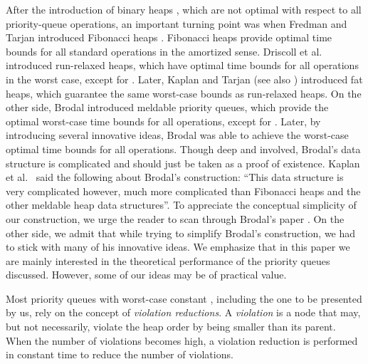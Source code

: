 \documentclass{llncs}
\newcommand{\Decrease}{\mbox{}}
\newcommand{\Meld}{\mbox{}}
\begin{document}
After the introduction of binary heaps \cite{Wil64}, which are not
optimal with respect to all priority-queue operations, an important
turning point was when Fredman and Tarjan introduced Fibonacci heaps
\cite{FT87}. Fibonacci heaps provide optimal time bounds for all
standard operations in the amortized sense.  Driscoll et
al.~\cite{DGST88} introduced run-relaxed heaps, which have optimal
time bounds for all operations in the worst case, except for
\Meld{}. Later, Kaplan and Tarjan \cite{KT99} (see also \cite{KST02})
introduced fat heaps, which guarantee the same worst-case bounds as
run-relaxed heaps.  On the other side, Brodal \cite{Bro95} introduced
meldable priority queues, which provide the optimal worst-case time
bounds for all operations, except for \Decrease{}. Later, by
introducing several innovative ideas, Brodal \cite{Bro96} was able to
achieve the worst-case optimal time bounds for all operations.  Though
deep and involved, Brodal's data structure is complicated and should
just be taken as a proof of existence.
Kaplan et al.~\cite{KST02} said the following about Brodal's construction: 
``This data structure is very complicated however, much more complicated 
than Fibonacci heaps and the other meldable heap data structures''.  
To appreciate the conceptual simplicity of our construction, we urge the 
reader to scan through Brodal's paper \cite{Bro96}.  On the other side, 
we admit that while trying to simplify Brodal's construction, we had to 
stick with many of his innovative ideas.
We emphasize that in this paper we are mainly interested in the
theoretical performance of the priority queues discussed.  However,
some of our ideas may be of practical value.

Most priority queues with worst-case constant \Decrease{}, including
the one to be presented by us, rely on the concept of \emph{violation
  reductions}.  A \emph{violation} is a node that may, but not necessarily, violate the heap
order by being smaller than its parent.  When the number of violations
becomes high, a violation reduction is performed in constant time to
reduce the number of violations.
\end{document}
